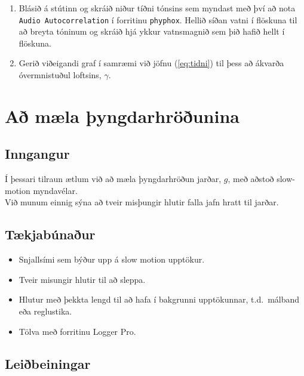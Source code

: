 \documentclass[oneside]{book}
\theoremstyle{definition}
\begin{document}
\begin{enumerate}[label = (\roman*)]
    \item Blásið á stútinn og skráið niður tíðni tónsins sem myndast með því að nota \verb|Audio Autocorrelation| í forritinu \verb|phyphox|. Hellið síðan vatni í flöskuna til að breyta tóninum og skráið hjá ykkur vatnsmagnið sem þið hafið hellt í flöskuna.
     
    \item Gerið viðeigandi graf í samræmi við jöfnu (\ref{eq:tidni}) til þess að ákvarða óvermnistuðul loftsins, $\gamma$.
\end{enumerate}

\newpage

\section{Að mæla þyngdarhröðunina}

\subsection*{Inngangur}

Í þessari tilraun ætlum við að mæla þyngdarhröðun jarðar, $g$, með aðstoð slow-motion myndavélar. \\ Við munum einnig sýna að tveir misþungir hlutir falla jafn hratt til jarðar.

\subsection*{Tækjabúnaður}

\begin{itemize}
    \item Snjallsími sem býður upp á slow motion upptökur.
    
    \item Tveir misungir hlutir til að sleppa.
    
    \item Hlutur með þekkta lengd til að hafa í bakgrunni upptökunnar, t.d.~málband eða reglustika.
    
    \item Tölva með forritinu Logger Pro.
\end{itemize}

\subsection*{Leiðbeiningar}
\end{document}
